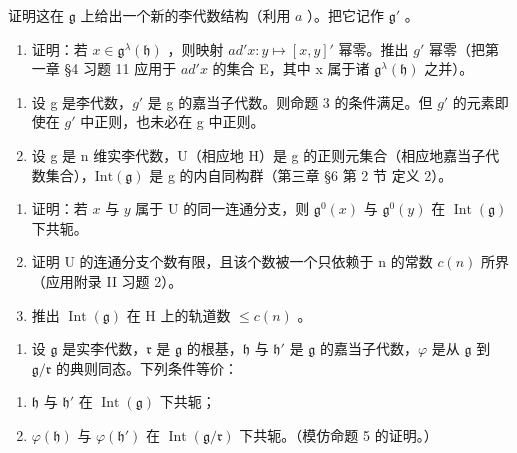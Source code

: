 证明这在 \(\mathfrak{g}\) 上给出一个新的李代数结构（利用 \(a\) ）。把它记作 \(\mathfrak{g}'\) 。

\begin{enumerate}
\def\labelenumi{\alph{enumi})}
\setcounter{enumi}{2}
\tightlist
\item
  证明：若 \(x \in \mathfrak{g}^{\lambda}(\mathfrak{h})\) ，则映射 \(ad'x : y \mapsto [x, y]'\) 幂零。推出 \(g'\) 幂零（把第一章 §4 习题 11 应用于 \(ad'x\) 的集合 E，其中 x 属于诸 \(\mathfrak{g}^{\lambda}(\mathfrak{h})\) 之并）。
\end{enumerate}


\begin{enumerate}
\def\labelenumi{\arabic{enumi})}
\item
  设 g 是李代数，\(g'\) 是 g 的嘉当子代数。则命题 3 的条件满足。但 \(g'\) 的元素即使在 \(g'\) 中正则，也未必在 g 中正则。
\item
  设 g 是 n 维实李代数，U（相应地 H）是 g 的正则元集合（相应地嘉当子代数集合），\(\text{Int}(\mathfrak{g})\) 是 g 的内自同构群（第三章 §6 第 2 节 定义 2）。
\end{enumerate}

\begin{enumerate}
\def\labelenumi{\alph{enumi})}
\item
  证明：若 \(x\) 与 \(y\) 属于 \(\mathrm{U}\) 的同一连通分支，则 \(\mathfrak{g}^0(x)\) 与 \(\mathfrak{g}^0(y)\) 在 \(\operatorname{Int}(\mathfrak{g})\) 下共轭。
\item
  证明 U 的连通分支个数有限，且该个数被一个只依赖于 n 的常数 \(c(n)\) 所界（应用附录 II 习题 2）。
\item
  推出 \(\operatorname{Int}(\mathfrak{g})\) 在 \(\mathrm{H}\) 上的轨道数 \(\leq c(n)\) 。
\end{enumerate}

\begin{enumerate}
\def\labelenumi{\arabic{enumi})}
\setcounter{enumi}{2}
\tightlist
\item
  设 \(\mathfrak{g}\) 是实李代数，\(\mathfrak{r}\) 是 \(\mathfrak{g}\) 的根基，\(\mathfrak{h}\) 与 \(\mathfrak{h}'\) 是 \(\mathfrak{g}\) 的嘉当子代数，\(\varphi\) 是从 \(\mathfrak{g}\) 到 \(\mathfrak{g} / \mathfrak{r}\) 的典则同态。下列条件等价：
\end{enumerate}

\begin{enumerate}
\def\labelenumi{(\roman{enumi})}
\item
  \(\mathfrak{h}\) 与 \(\mathfrak{h}'\) 在 \(\operatorname{Int}(\mathfrak{g})\) 下共轭；
\item
  \(\varphi(\mathfrak{h})\) 与 \(\varphi(\mathfrak{h}')\) 在 \(\operatorname{Int}(\mathfrak{g}/\mathfrak{r})\) 下共轭。（模仿命题 5 的证明。）
\end{enumerate}

